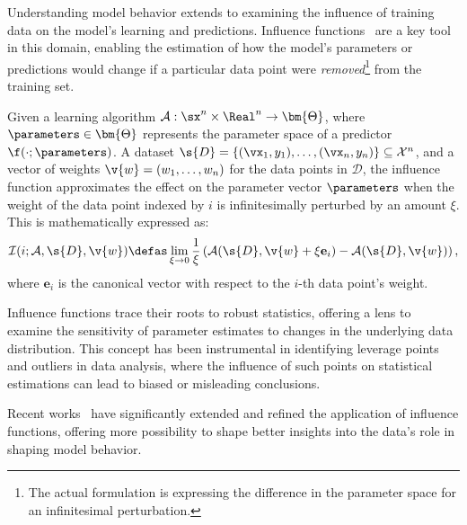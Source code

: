 Understanding model behavior extends to examining the influence of training data on the model's learning and predictions. Influence functions~\cite{cook1980characterizations} are a key tool in this domain, enabling the estimation of how the model's parameters or predictions would change if a particular data point were \textit{removed}\footnote{The actual formulation is expressing the difference in the parameter space for an infinitesimal perturbation.} from the training set.

\begin{definition}
Given a learning algorithm $\mathcal{A} : \sx^n \times \Real^n \to \bm{\Theta}$, where $\parameters \in \bm{\Theta}$ represents the parameter space of a predictor $\f(\cdot; \parameters)$. A dataset $\s{D} = \{(\vx_1, y_1), \ldots, (\vx_n, y_n)\} \subseteq \mathcal{X}^n$, and a vector of weights $\v{w} = (w_1, \ldots, w_n)$ for the data points in $\mathcal{D}$, the influence function approximates the effect on the parameter vector $\parameters$ when the weight of the data point indexed by $i$ is infinitesimally perturbed by an amount $\xi$. This is mathematically expressed as:
\[
\mathcal{I}(i ; \mathcal{A}, \s{D}, \v{w}) \defas \lim_{\xi \to 0} \frac{1}{\xi} \left( \mathcal{A}(\s{D}, \v{w} + \xi \mathbf{e}_i) - \mathcal{A}(\s{D}, \v{w}) \right),
\]
where $\mathbf{e}_i$ is the canonical vector with respect to the $i$-th data point's weight.
\end{definition}

Influence functions trace their roots to robust statistics, offering a lens to examine the sensitivity of parameter estimates to changes in the underlying data distribution. This concept has been instrumental in identifying leverage points and outliers in data analysis, where the influence of such points on statistical estimations can lead to biased or misleading conclusions.

Recent works~\cite{koh2017understanding} have significantly extended and refined the application of influence functions, offering more possibility to shape better insights into the data's role in shaping model behavior. 
